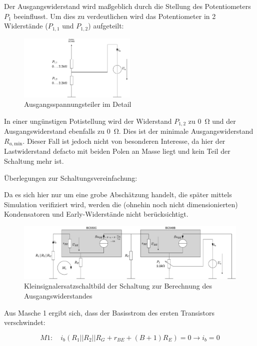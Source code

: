Der Ausgangswiderstand wird maßgeblich durch die Stellung des Potentiometers $P_1$ beeinflusst. Um dies zu verdeutlichen wird das Potentiometer in 2 Widerstände ($P_{1,1}$ und $P_{1,2}$) aufgeteilt:

\begin{figure}[H]
    \centering
    \includegraphics[width = 0.5\textwidth]{tex/1_Microphone/pictures/ra_spannungsteiler.pdf}
    \caption{Ausgangsspannungsteiler im Detail}
    \label{fig:my_label}
\end{figure}

In einer ungünstigen Potistellung wird der Widerstand $P_{1,2}$ zu \SI{0}{\ohm} und der Ausgangswiderstand ebenfalls zu \SI{0}{\ohm}. Dies ist der minimale Ausgangswiderstand $R_{a,\text{min}}$. Dieser Fall ist jedoch nicht von besonderen Interesse, da hier der Lastwiderstand defacto mit beiden Polen an Masse liegt und kein Teil der Schaltung mehr ist.

Überlegungen zur Schaltungsvereinfachung:

Da es sich hier nur um eine grobe Abschätzung handelt, die später mittels Simulation verifiziert wird, werden die (ohnehin noch nicht dimensionierten) Kondensatoren und Early-Widerstände nicht berücksichtigt.

\begin{figure}[H]
    \centering
    \includegraphics[width = \textwidth]{tex/1_Microphone/pictures/KSESB_simplified.pdf}
    \caption{Kleinsignalersatzschaltbild der Schaltung zur Berechnung des Ausgangswiderstandes}
    \label{fig:my_label}
\end{figure}

Aus Masche 1 ergibt sich, dass der Basisstrom des ersten Transistors verschwindet:

\begin{equation*}
    M1: \quad i_b \left( R_1 || R_2 || R_G + r_{BE} + (B + 1) R_E\right) = 0 \rightarrow i_b = 0
\end{equation*}

